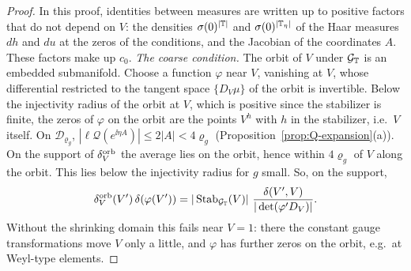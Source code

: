 \begin{proof}
In this proof, identities between measures are written up to positive factors that do not depend on $V$: the densities $\sigma(0)^{|\mathbb T|}$ and $\sigma(0)^{|\mathbb T_\eta|}$ of the Haar measures $dh$ and $du$ at the zeros of the conditions, and the Jacobian of the coordinates $A$. These factors make up $c_0$. \emph{The coarse condition.} The orbit of $V$ under $\mathcal G_\mathbb T$ is an embedded submanifold. Choose a function $\varphi$ near $V$, vanishing at $V$, whose differential restricted to the tangent space $\{D_V\mu\}$ of the orbit is invertible. Below the injectivity radius of the orbit at $V$, which is positive since the stabilizer is finite, the zeros of $\varphi$ on the orbit are the points $V^h$ with $h$ in the stabilizer, i.e.\ $V$ itself. On $\mathcal D_{\varrho_g}$, $|\ell\mathcal Q(e^{\ii\eta A})|\le2|A|<4\varrho_g$ (Proposition~\ref{prop:Q-expansion}(a)). On the support of $\delta^{\rm orb}_V$ the average lies on the orbit, hence within $4\varrho_g$ of $V$ along the orbit. This lies below the injectivity radius for $g$ small. So, on the support,
\[
\delta^{\rm orb}_V(V')\,\delta(\varphi(V'))=|\operatorname{Stab}_{\mathcal G_\mathbb T}(V)|\ \frac{\delta(V',V)}{|\det(\varphi'D_V)|} .
\]
Without the shrinking domain this fails near $V=1$: there the constant gauge transformations move $V$ only a little, and $\varphi$ has further zeros on the orbit, e.g.\ at Weyl-type elements.


\end{proof}
